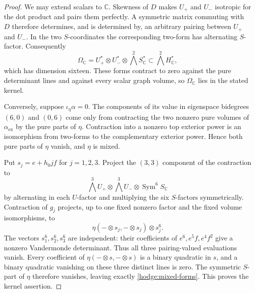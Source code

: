 \documentclass[11pt]{article}
\theoremstyle{definition}
\theoremstyle{remark}
\newcommand{\C}{\mathbb C}
\numberwithin{equation}{section}
\begin{document}
\begin{proof}
We may extend scalars to $\C$.  Skewness of $D$ makes $U_+$ and $U_-$
isotropic for the dot product and pairs them perfectly.  A symmetric
matrix commuting with $D$ therefore determines, and is determined by,
an arbitrary pairing between $U_+$ and $U_-$.  In the two $S$-coordinates
the corresponding two-form has alternating $S$-factor.  Consequently
\begin{equation}
 \Omega_\C=
 U_+^*\otimes U_-^*\otimes\bigwedge^2S_\C^*
       \subset\bigwedge^2H_\C^*,
 \label{hodge:mixed-forms}
\end{equation}
which has dimension sixteen.  These forms contract to zero against the
pure determinant lines and against every scalar graph volume, so
$\Omega_\C$ lies in the stated kernel.

Conversely, suppose $\iota_\eta\alpha=0$.  The components of its value
in eigenspace bidegrees $(6,0)$ and $(0,6)$ come only from contracting
the two nonzero pure volumes of $\alpha_{\mathrm{ex}}$ by the pure parts
of $\eta$.  Contraction into a nonzero top exterior power is an
isomorphism from two-forms to the complementary exterior power.  Hence
both pure parts of $\eta$ vanish, and $\eta$ is mixed.

Put $s_j=e+h_0jf$ for $j=1,2,3$.
Project the $(3,3)$ component of the contraction to
\[
 \bigwedge^3U_+\otimes\bigwedge^3U_-\otimes
              \operatorname{Sym}^6S_\C
\]
by alternating in each $U$-factor and multiplying the six $S$-factors
symmetrically.  Contraction of $g_j$ projects, up to one fixed nonzero
factor and the fixed volume isomorphisms, to
\[
 \eta(-\otimes s_j,-\otimes s_j)\otimes s_j^6.
\]
The vectors $s_1^6,s_2^6,s_3^6$ are independent: their coefficients of
$e^6,e^5f,e^4f^2$ give a nonzero Vandermonde determinant.
Thus all three pairing-valued evaluations vanish.  Every coefficient
of $\eta(-\otimes s,-\otimes s)$ is a binary quadratic in $s$,
and a binary quadratic vanishing on these three distinct lines is zero.
The symmetric $S$-part of $\eta$ therefore vanishes, leaving exactly
\eqref{hodge:mixed-forms}.  This proves the kernel assertion.


\end{proof}
\end{document}
